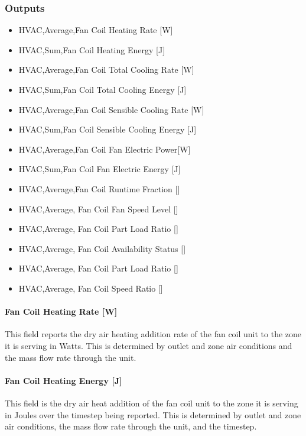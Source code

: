 \subsubsection{Outputs}\label{outputs-1-033}

\begin{itemize}
\item
  HVAC,Average,Fan Coil Heating Rate {[}W{]}
\item
  HVAC,Sum,Fan Coil Heating Energy {[}J{]}
\item
  HVAC,Average,Fan Coil Total Cooling Rate {[}W{]}
\item
  HVAC,Sum,Fan Coil Total Cooling Energy {[}J{]}
\item
  HVAC,Average,Fan Coil Sensible Cooling Rate {[}W{]}
\item
  HVAC,Sum,Fan Coil Sensible Cooling Energy {[}J{]}
\item
  HVAC,Average,Fan Coil Fan Electric Power{[}W{]}
\item
  HVAC,Sum,Fan Coil Fan Electric Energy {[}J{]}
\item
  HVAC,Average,Fan Coil Runtime Fraction {[]}
\item
  HVAC,Average, Fan Coil Fan Speed Level {[]}
\item
  HVAC,Average, Fan Coil Part Load Ratio {[]}
\item
  HVAC,Average, Fan Coil Availability Status {[]}
\item
  HVAC,Average, Fan Coil Part Load Ratio {[]}
\item
  HVAC,Average, Fan Coil Speed Ratio {[]}
\end{itemize}

\paragraph{Fan Coil Heating Rate {[}W{]}}\label{fan-coil-heating-rate-w}

This field reports the dry air heating addition rate of the fan coil unit to the zone it is serving in Watts. This is determined by outlet and zone air conditions and the mass flow rate through the unit.

\paragraph{Fan Coil Heating Energy {[}J{]}}\label{fan-coil-heating-energy-j}

This field is the dry air heat addition of the fan coil unit to the zone it is serving in Joules over the timestep being reported. This is determined by outlet and zone air conditions, the mass flow rate through the unit, and the timestep.

